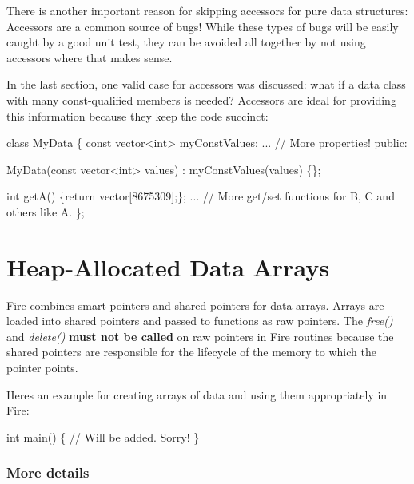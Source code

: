 There is another important reason for skipping accessors for pure data structures\+: Accessors are a common source of bugs! While these types of bugs will be easily caught by a good unit test, they can be avoided all together by not using accessors where that makes sense.

In the last section, one valid case for accessors was discussed\+: what if a data class with many const-\/qualified members is needed? Accessors are ideal for providing this information because they keep the code succinct\+:


\begin{DoxyCode}
\textcolor{keyword}{class }MyData \{
    \textcolor{keyword}{const} vector<int> myConstValues;
    ... \textcolor{comment}{// More properties!}
\textcolor{keyword}{public}:

    MyData(\textcolor{keyword}{const} vector<int> values) : myConstValues(values) \{\};

    \textcolor{keywordtype}{int} getA() \{\textcolor{keywordflow}{return} vector[8675309];\};
    ... \textcolor{comment}{// More get/set functions for B, C and others  like A.}
\};
\end{DoxyCode}


\section*{Heap-\/\+Allocated Data Arrays}

Fire combines smart pointers and shared pointers for data arrays. Arrays are loaded into shared pointers and passed to functions as raw pointers. The {\itshape free()} and {\itshape delete()} {\bfseries must not be called} on raw pointers in Fire routines because the shared pointers are responsible for the lifecycle of the memory to which the pointer points.

Here\textquotesingle{}s an example for creating arrays of data and using them appropriately in Fire\+:


\begin{DoxyCode}
\textcolor{keywordtype}{int} main() \{
    \textcolor{comment}{// Will be added. Sorry!}
\}
\end{DoxyCode}


\subsubsection*{More details}

